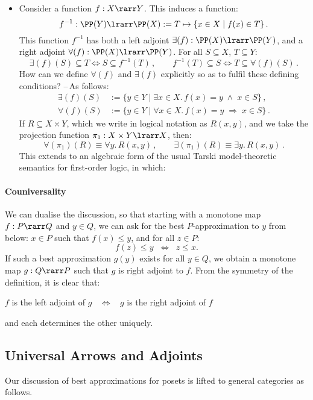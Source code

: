 \documentclass{svmult}
\begin{document}
\begin{itemize}
%
\item Consider a function $f : X \rarr Y$. This induces a function:
\[ f^{-1} : \PP(Y) \lrarr \PP(X) := T \mapsto \{ x \in X \mid f(x) \in T \}\,. \]
This function $f^{-1}$ has both a left adjoint $\exists (f) : \PP(X) \lrarr \PP(Y)$, and a right adjoint $\forall (f) : \PP(X) \lrarr \PP(Y)$. For all
$S \subseteq X$, $T \subseteq Y$:
\[ \exists(f)(S) \subseteq T \iff S \subseteq f^{-1}(T)\,,\qquad  f^{-1}(T) \subseteq S \iff  T \subseteq \forall(f)(S)\,. \]
How can we define $\forall(f)$ and $\exists(f)$ explicitly so as to fulfil these defining conditions? --\,As follows:
\begin{align*}
\exists(f)(S) &:= \{ y \in Y \mid \exists x \in X. \, f(x) = y \; \wedge \; x \in S \}\,,  \\
\forall(f)(S) &:= \{ y \in Y \mid \forall x \in X. \, f(x) = y \; \Rightarrow \; x \in S \}\,.
\end{align*}
%
If $R \subseteq X \times Y$, which we write in logical notation as $R(x, y)$, and we take the projection function $\pi_{1} : X \times Y \lrarr X$,
then:
\[ \forall(\pi_{1})(R) \equiv \forall y. \, R(x, y)\,, \qquad \exists(\pi_{1})(R) \equiv \exists y. \, R(x, y)\,. \]
%
This extends to an algebraic form of the usual Tarski model-theoretic semantics for first-order logic, in which:
\begin{center}
\end{center}
\end{itemize}

\paragraph{Couniversality}
We can dualise the discussion, so that starting with a monotone map $f : P \rarr Q$ and $y \in Q$, we can ask for the best $P$-approximation to $y$ from below: $x \in P$ such that $f(x) \leq y$, and for all $z \in P$:
\[ f(z) \leq y \;\; \Longleftrightarrow \;\; z \leq x . \]
%
If such a best approximation $g(y)$ exists for all $y \in Q$, we obtain a monotone map $g : Q \rarr P$ such that $g$ is right adjoint to $f$.
From the symmetry of the definition, it is clear that:
\begin{center}
 $f$ is the left adjoint of $g$ $\;\; \Longleftrightarrow \;\;$ $g$ is the right adjoint of $f$
\end{center}
and each determines the other uniquely.

\subsection{Universal Arrows and Adjoints}
Our discussion of best approximations for posets is lifted to general categories as follows.
\end{document}
